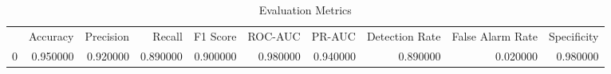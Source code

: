 \begin{table}
\caption{Evaluation Metrics}
\label{tab:metrics}
\begin{tabular}{lrrrrrrrrr}
 & Accuracy & Precision & Recall & F1 Score & ROC-AUC & PR-AUC & Detection Rate & False Alarm Rate & Specificity \\
0 & 0.950000 & 0.920000 & 0.890000 & 0.900000 & 0.980000 & 0.940000 & 0.890000 & 0.020000 & 0.980000 \\
\end{tabular}
\end{table}
